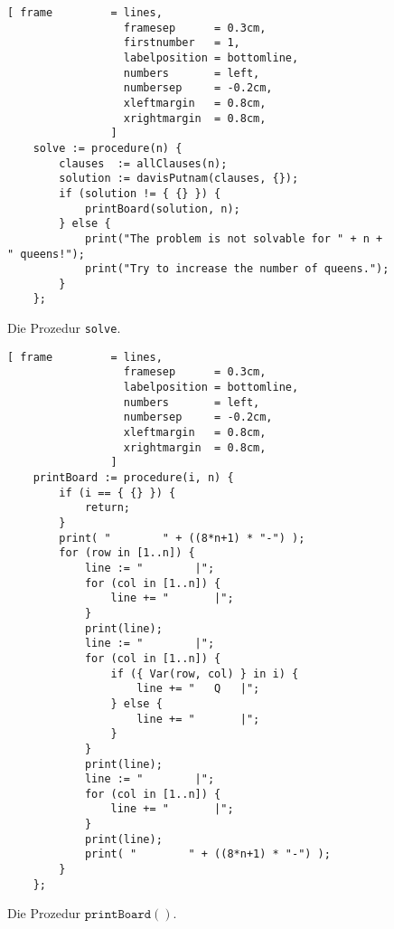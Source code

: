 \begin{figure}[!ht]
\centering
\begin{Verbatim}[ frame         = lines, 
                  framesep      = 0.3cm, 
                  firstnumber   = 1,
                  labelposition = bottomline,
                  numbers       = left,
                  numbersep     = -0.2cm,
                  xleftmargin   = 0.8cm,
                  xrightmargin  = 0.8cm,
                ]
    solve := procedure(n) {
        clauses  := allClauses(n);
        solution := davisPutnam(clauses, {});
        if (solution != { {} }) {
            printBoard(solution, n);
        } else {
            print("The problem is not solvable for " + n + " queens!");
            print("Try to increase the number of queens.");
        }
    };
\end{Verbatim}
\vspace*{-0.3cm}
\caption{Die Prozedur \texttt{solve}.}
\label{fig:davisPutnam:solve}
\end{figure}


\begin{figure}[!ht]
\centering
\begin{Verbatim}[ frame         = lines, 
                  framesep      = 0.3cm, 
                  labelposition = bottomline,
                  numbers       = left,
                  numbersep     = -0.2cm,
                  xleftmargin   = 0.8cm,
                  xrightmargin  = 0.8cm,
                ]
    printBoard := procedure(i, n) {
        if (i == { {} }) {
            return;
        }
        print( "        " + ((8*n+1) * "-") );
        for (row in [1..n]) {
            line := "        |";
            for (col in [1..n]) {
                line += "       |";
            }
            print(line);
            line := "        |";
            for (col in [1..n]) {
                if ({ Var(row, col) } in i) {
                    line += "   Q   |";
                } else {
                    line += "       |";
                }
            }
            print(line);
            line := "        |";
            for (col in [1..n]) {
                line += "       |";
            }
            print(line);
            print( "        " + ((8*n+1) * "-") );
        }
    };
\end{Verbatim}
\vspace*{-0.3cm}
\caption{Die Prozedur $\texttt{printBoard}()$.}
\label{fig:printBoard}
\end{figure}

\pagebreak

